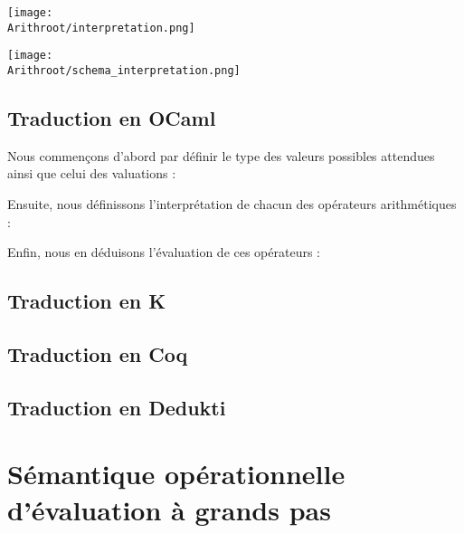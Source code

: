 \texttt{[image: \\Arithroot/interpretation.png]}

\texttt{[image: \\Arithroot/schema\_interpretation.png]}

	\subsection{Traduction en OCaml}
Nous commençons d'abord par définir le type des valeurs possibles attendues ainsi que celui des valuations :

Ensuite, nous définissons l'interprétation de chacun des opérateurs arithmétiques :

Enfin, nous en déduisons l'évaluation de ces opérateurs :


	\subsection{Traduction en K}


	\subsection{Traduction en Coq}
	\subsection{Traduction en Dedukti}

%

%

%
















\section{Sémantique opérationnelle d’évaluation à grands pas}

